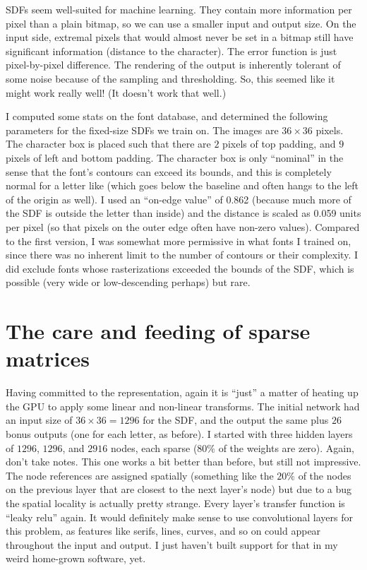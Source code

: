 \documentclass[twocolumn]{article} %
\begin{document}
SDFs seem well-suited for machine learning. They contain more
information per pixel than a plain bitmap, so we can use a smaller
input and output size. On the input side, extremal pixels that would
almost never be set in a bitmap still have significant information
(distance to the character). The error function is just pixel-by-pixel
difference. The rendering of the output is inherently tolerant of some
noise because of the sampling and thresholding. So, this seemed like
it might work really well! (It doesn't work that well.)

I computed some stats on the font database, and determined the
following parameters for the fixed-size SDFs we train on. The images
are $36 \times 36$ pixels. The character box is placed such that there
are $2$ pixels of top padding, and $9$ pixels of left and bottom
padding. The character box is only ``nominal'' in the sense that the
font's contours can exceed its bounds, and this is completely normal
for a letter like  (which goes below the baseline and
often hangs to the left of the origin as well). I used an ``on-edge
value'' of 0.862 (because much more of the SDF is outside the letter
than inside) and the distance is scaled as 0.059 units per pixel (so
that pixels on the outer edge often have non-zero values). Compared to
the first version, I was somewhat more permissive in what fonts I
trained on, since there was no inherent limit to the number of
contours or their complexity. I did exclude fonts whose rasterizations
exceeded the bounds of the SDF, which is possible (very wide
 or low-descending  perhaps) but rare.

\section{The care and feeding of sparse matrices} \label{sec:neural}

Having committed to the representation, again it is ``just'' a matter
of heating up the GPU to apply some linear and non-linear transforms.
The initial network had an input size of $36 \times 36 = 1296$ for the
SDF, and the output the same plus $26$ bonus outputs (one for each
letter, as before). I started with three hidden layers of $1296$, $1296$,
and $2916$ nodes, each sparse ($80\%$ of the weights are zero). Again,
don't take notes. This one works a bit better than before, but still
not impressive. The node references are assigned spatially (something
like the $20\%$ of the nodes on the previous layer that are closest to
the next layer's node) but due to a bug the spatial locality is
actually pretty strange.
Every layer's transfer function is ``leaky relu'' again. It would
definitely make sense to use convolutional layers for this problem, as
features like serifs, lines, curves, and so on could appear throughout
the input and output. I just haven't built support for that in my
weird home-grown software, yet.
\end{document}
